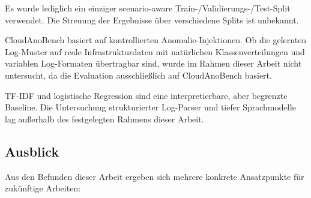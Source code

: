 \begin{description}
  \item[Einzelner Split.] Es wurde lediglich ein einziger scenario-aware
Train-/Validierungs-/Test-Split verwendet. Die Streuung der Ergebnisse über
verschiedene Splits ist unbekannt.

  \item[Synthetischer Datensatz.] CloudAnoBench basiert auf kontrollierten
Anomalie-In\-jek\-tio\-nen. Ob die gelernten Log-Muster auf reale
Infrastrukturdaten mit natürlichen Klassenverteilungen und variablen
Log-Formaten übertragbar sind, wurde im Rahmen dieser Arbeit nicht untersucht,
da die Evaluation ausschließlich auf CloudAnoBench basiert.

  \item[Keine Sequenzmodelle oder semantische Log-Encoder.] TF-IDF und
logistische Regression sind eine interpretierbare, aber begrenzte Baseline.
Die Untersuchung strukturierter Log-Parser und tiefer Sprachmodelle lag
außerhalb des festgelegten Rahmens dieser Arbeit.
\end{description}

\subsection{Ausblick}

Aus den Befunden dieser Arbeit ergeben sich mehrere konkrete Ansatzpunkte
für zukünftige Arbeiten:

